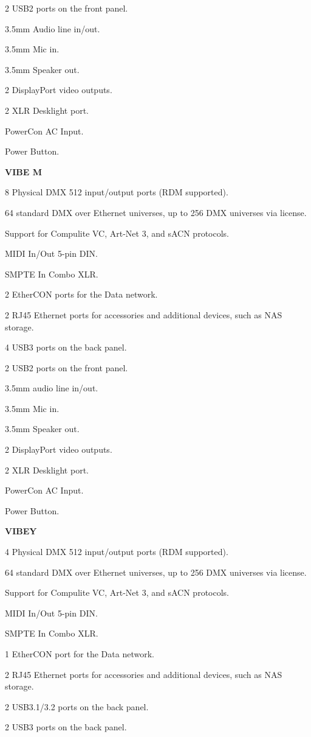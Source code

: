 \documentclass[
]{article}
\begin{document}
2 USB2 ports on the front panel.

3.5mm Audio line in/out.

3.5mm Mic in.

3.5mm Speaker out.

2 DisplayPort video outputs.

2 XLR Desklight port.

PowerCon AC Input.

Power Button.

\textbf{VIBE M}

8 Physical DMX 512 input/output ports (RDM supported).

64 standard DMX over Ethernet universes, up to 256 DMX universes via license.

Support for Compulite VC, Art-Net 3, and sACN protocols.

MIDI In/Out 5-pin DIN.

SMPTE In Combo XLR.

2 EtherCON ports for the Data network.

2 RJ45 Ethernet ports for accessories and additional devices, such as NAS storage.

4 USB3 ports on the back panel.

2 USB2 ports on the front panel.

3.5mm audio line in/out.

3.5mm Mic in.

3.5mm Speaker out.

2 DisplayPort video outputs.

2 XLR Desklight port.

PowerCon AC Input.

Power Button.

\textbf{VIBEY}

4 Physical DMX 512 input/output ports (RDM supported).

64 standard DMX over Ethernet universes, up to 256 DMX universes via license.

Support for Compulite VC, Art-Net 3, and sACN protocols.

MIDI In/Out 5-pin DIN.

SMPTE In Combo XLR.

1 EtherCON port for the Data network.

2 RJ45 Ethernet ports for accessories and additional devices, such as NAS storage.

2 USB3.1/3.2 ports on the back panel.

2 USB3 ports on the back panel.
\end{document}
